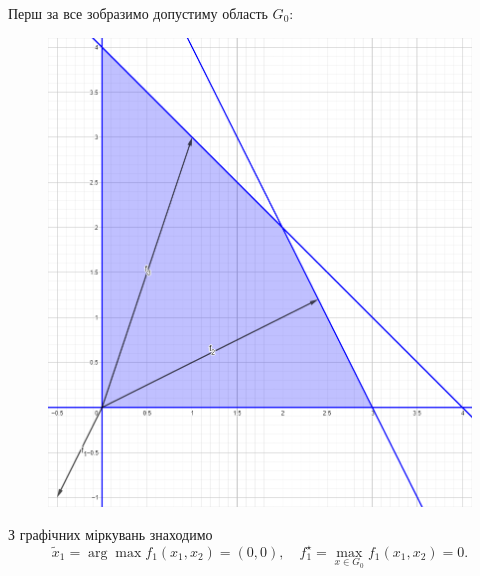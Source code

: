 \begin{solution}
    Перш за все зобразимо допустиму область $G_0$:
    \begin{figure}[H]
        \centering
        \includegraphics[width=\textwidth]{successive_concessions_2_1.png}
    \end{figure}

    З графічних міркувань знаходимо \[ \tilde x_1 = \arg \max f_1(x_1, x_2) = (0, 0), \quad f_1^\star = \max_{x \in G_0} f_1(x_1, x_2) = 0. \]
    

\end{solution}

